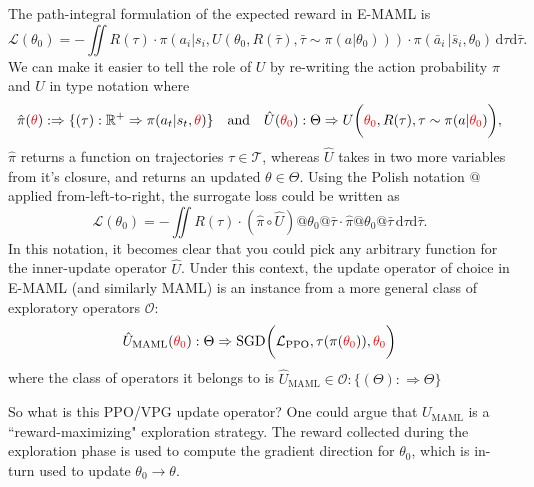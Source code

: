 \documentclass{article} %
\begin{document}
The path-integral formulation of the expected reward in E-MAML is \begin{equation}
    \mathcal L(\theta_0) = - \iint R(\tau) 
    \cdot
    \pi (a_i \vert s_i, U(\theta_0, R(\bar\tau), \bar\tau\sim\pi(a\vert \theta_0))) 
    \cdot 
    \pi(\bar a_i\,\vert \bar s_i, \theta_0) \, \mathrm{d} \tau \mathrm d \bar \tau.
\end{equation} We can make it easier to tell the role of $U$ by re-writing the action probability $\pi$ and $U$ in type notation where \begin{equation}
\hat\pi( {\color{red}\theta} ) 
        :\Rightarrow \{
                (\tau) :\mathbb R^+\Rightarrow \pi(a_t \vert s_t,  {\color{red}\theta} ) 
        \}
\hspace{1em}\text{and}\hspace{1em}
\hat U({\color{red}\theta_0}) :\Theta \Rightarrow U \bigg({\color{red}\theta_0}, R(\tau), \tau \sim \pi(a\vert{\color{red}\theta_0}) \bigg),
\end{equation}
$\hat\pi$ returns a function on trajectories $\tau \in \mathcal T$, whereas $\hat U$ takes in two more variables from it's closure, and returns an updated $\theta \in \Theta$. Using the Polish notation $@$ applied from-left-to-right, the surrogate loss could be written as
\begin{equation}
    \mathcal L(\theta_0) = - \iint R(\tau) 
    \cdot
    \left(\hat \pi \circ \hat U \right) @ \theta_0 @\bar\tau
    \cdot 
    \hat \pi @ \theta_0 @ \bar\tau \, \mathrm{d} \tau \mathrm d \bar \tau.
\end{equation} In this notation, it becomes clear that you could pick any arbitrary function for the inner-update operator $\hat U$. Under this context, the update operator of choice in E-MAML (and similarly MAML) is an instance from a more general class of exploratory operators $\mathcal O$: \begin{equation}
    \hat U_{\text{MAML}}({\color{red}\theta_0}):\Theta \Rightarrow \text{SGD} \bigg(\mathcal L_{\text{PPO}}, \tau(\pi({\color{red}\theta_0})), {\color{red}\theta_0} \bigg) 
\end{equation} where the class of operators it belongs to is \( \hat U_{\text{MAML}} \in \mathcal O : \{ (\Theta) :\Rightarrow \Theta \} \)

So what is this PPO/VPG update operator? One could argue that $U_{\text{MAML}}$ is a ``reward-maximizing" exploration strategy. The reward collected during the exploration phase is used to compute the gradient direction for $\theta_0$, which is in-turn used to update $\theta_0 \rightarrow \theta$.
\end{document}
